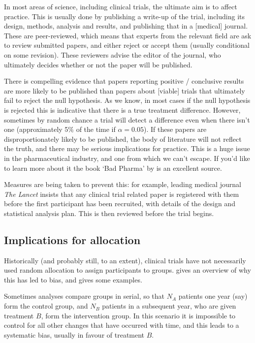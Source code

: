 \documentclass[
  openany]{book}
\theoremstyle{definition}
\theoremstyle{definition}
\theoremstyle{definition}
\theoremstyle{definition}
\theoremstyle{remark}
\begin{document}
In most areas of science, including clinical trials, the ultimate aim is to affect practice. This is usually done by publishing a write-up of the trial, including its design, methods, analysis and results, and publishing that in a {[}medical{]} journal. These are peer-reviewed, which means that experts from the relevant field are ask to review submitted papers, and either reject or accept them (usually conditional on some revision). These reviewers advise the editor of the journal, who ultimately decides whether or not the paper will be published.

There is compelling evidence that papers reporting positive / conclusive results are more likely to be published than papers about {[}viable{]} trials that ultimately fail to reject the null hypothesis. As we know, in most cases if the null hypothesis is rejected this is indicative that there is a true treatment difference. However, sometimes by random chance a trial will detect a difference even when there isn't one (approximately 5\% of the time if \(\alpha=0.05\)). If these papers are disproportionately likely to be published, the body of literature will not reflect the truth, and there may be serious implications for practice. This is a huge issue in the pharmaceutical industry, and one from which we can't escape. If you'd like to learn more about it the book `Bad Pharma' by \citet{goldacre2012bad} is an excellent source.

Measures are being taken to prevent this: for example, leading medical journal \emph{The Lancet} insists that any clinical trial related paper is registered with them before the first participant has been recruited, with details of the design and statistical analysis plan. This is then reviewed before the trial begins.

\subsection{Implications for allocation}\label{implications-for-allocation}

Historically (and probably still, to an extent), clinical trials have not necessarily used random allocation to assign participants to groups. \citet{altman1999treatment} gives an overview of why this has led to bias, and gives some examples.

Sometimes analyses compare groups in serial, so that \(N_A\) patients one year (say) form the control group, and \(N_B\) patients in a subsequent year, who are given treatment \(B\), form the intervention group. In this scenario it is impossible to control for all other changes that have occurred with time, and this leads to a systematic bias, usually in favour of treatment \(B\).
\end{document}
